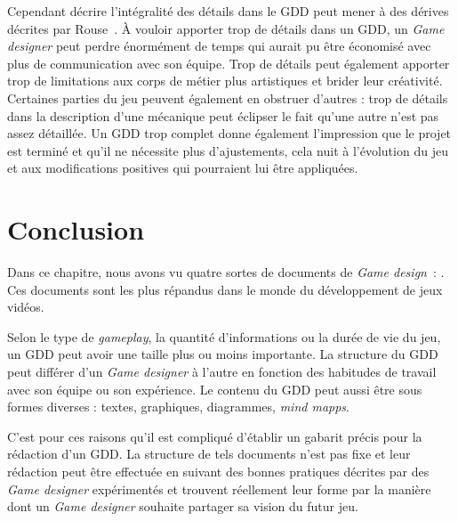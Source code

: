 Cependant décrire l'intégralité des détails dans le GDD peut mener à des dérives décrites par Rouse~\cite{GD_theory_rouse}. À vouloir apporter trop de détails dans un GDD, un \emph{Game designer} peut perdre énormément de temps qui aurait pu être économisé avec plus de communication avec son équipe. Trop de détails peut également apporter trop de limitations aux corps de métier plus artistiques et brider leur créativité. Certaines parties du jeu peuvent également en obstruer d'autres : trop de détails dans la description d'une mécanique peut éclipser le fait qu'une autre n'est pas assez détaillée. Un GDD trop complet donne également l'impression que le projet est terminé et qu'il ne nécessite plus d'ajustements, cela nuit à l'évolution du jeu et aux modifications positives qui pourraient lui être appliquées.





\section{Conclusion}
Dans ce chapitre, nous avons vu quatre sortes de documents de \emph{Game design}~: .
%  
Ces documents sont les plus répandus dans le monde du développement de jeux vidéos. 

Selon le type de \emph{gameplay}, la quantité d'informations ou la durée de vie du jeu, un GDD peut avoir une taille plus ou moins importante. 
%
La structure du GDD peut différer d'un \emph{Game designer} à l'autre en fonction des habitudes de travail avec son équipe ou son expérience. Le contenu du GDD peut aussi être sous formes diverses :  textes,  graphiques, diagrammes,  \emph{mind mapps}. 

C'est pour ces raisons qu'il est compliqué d'établir un gabarit précis pour la rédaction d'un GDD. La structure de tels documents n'est pas fixe et leur rédaction peut \^etre effectuée en suivant des bonnes pratiques décrites par des \emph{Game designer} expérimentés et trouvent réellement leur forme par la manière dont un \emph{Game designer} souhaite partager sa vision du futur jeu.

